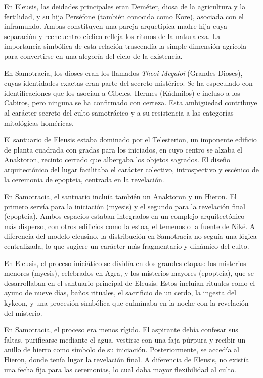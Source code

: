En Eleusis, las deidades principales eran Deméter, diosa de la agricultura y la fertilidad, y su hija Perséfone (también conocida como Kore), asociada con el inframundo. Ambas constituyen una pareja arquetípica madre-hija cuya separación y reencuentro cíclico refleja los ritmos de la naturaleza. La importancia simbólica de esta relación trascendía la simple dimensión agrícola para convertirse en una alegoría del ciclo de la existencia.

En Samotracia, los dioses eran los llamados \textit{Theoi Megaloi} (Grandes Dioses), cuyas identidades exactas eran parte del secreto mistérico. Se ha especulado con identificaciones que los asocian a Cibeles, Hermes (Kádmilos) e incluso a los Cabiros, pero ninguna se ha confirmado con certeza. Esta ambigüedad contribuye al carácter secreto del culto samotrácico y a su resistencia a las categorías mitológicas homéricas.

El santuario de Eleusis estaba dominado por el Telesterion, un imponente edificio de planta cuadrada con gradas para los iniciados, en cuyo centro se alzaba el Anaktoron, recinto cerrado que albergaba los objetos sagrados. El diseño arquitectónico del lugar facilitaba el carácter colectivo, introspectivo y escénico de la ceremonia de epopteia, centrada en la revelación.

En Samotracia, el santuario incluía también un Anaktoron y un Hieron. El primero servía para la iniciación (myesis) y el segundo para la revelación final (epopteia). Ambos espacios estaban integrados en un complejo arquitectónico más disperso, con otros edificios como la estoa, el temenos o la fuente de Niké. A diferencia del modelo eleusino, la distribución en Samotracia no seguía una lógica centralizada, lo que sugiere un carácter más fragmentario y dinámico del culto.

En Eleusis, el proceso iniciático se dividía en dos grandes etapas: los misterios menores (myesis), celebrados en Agra, y los misterios mayores (epopteia), que se desarrollaban en el santuario principal de Eleusis. Estos incluían rituales como el ayuno de nueve días, baños rituales, el sacrificio de un cerdo, la ingesta del kykeon, y una procesión simbólica que culminaba en la noche con la revelación del misterio.

En Samotracia, el proceso era menos rígido. El aspirante debía confesar sus faltas, purificarse mediante el agua, vestirse con una faja púrpura y recibir un anillo de hierro como símbolo de su iniciación. Posteriormente, se accedía al Hieron, donde tenía lugar la revelación final. A diferencia de Eleusis, no existía una fecha fija para las ceremonias, lo cual daba mayor flexibilidad al culto.

